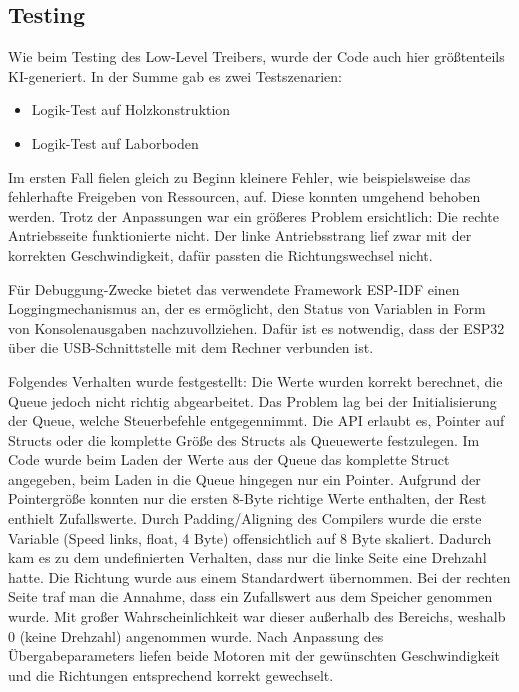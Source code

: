 \subsection{Testing} \label{sec:diff_drive_tests}

Wie beim Testing des Low-Level Treibers, wurde der Code auch hier größtenteils KI-generiert. In der Summe gab es zwei Testszenarien:

\begin{itemize}
    \item Logik-Test auf Holzkonstruktion
    \item Logik-Test auf Laborboden
\end{itemize}

Im ersten Fall fielen gleich zu Beginn kleinere Fehler, wie beispielsweise das fehlerhafte Freigeben von Ressourcen, auf. Diese konnten umgehend behoben werden. Trotz der Anpassungen war ein größeres Problem ersichtlich: Die rechte Antriebsseite funktionierte nicht. Der linke Antriebsstrang lief zwar mit der korrekten Geschwindigkeit, dafür passten die Richtungswechsel nicht. \newline

Für Debuggung-Zwecke bietet das verwendete Framework ESP-IDF einen Loggingmechanismus an, der es ermöglicht, den Status von Variablen in Form von Konsolenausgaben nachzuvollziehen. Dafür ist es notwendig, dass der ESP32 über die USB-Schnittstelle mit dem Rechner verbunden ist. \newline

Folgendes Verhalten wurde festgestellt: Die Werte wurden korrekt berechnet, die Queue jedoch nicht richtig abgearbeitet. Das Problem lag bei der Initialisierung der Queue, welche Steuerbefehle entgegennimmt. Die API erlaubt es, Pointer auf Structs oder die komplette Größe des Structs als Queuewerte festzulegen. Im Code wurde beim Laden der Werte aus der Queue das komplette Struct angegeben, beim Laden in die Queue hingegen nur ein Pointer. Aufgrund der Pointergröße konnten nur die ersten 8-Byte richtige Werte enthalten, der Rest enthielt Zufallswerte. Durch Padding/Aligning des Compilers wurde die erste Variable (Speed links, float, 4 Byte) offensichtlich auf 8 Byte skaliert. Dadurch kam es zu dem undefinierten Verhalten, dass nur die linke Seite eine Drehzahl hatte. Die Richtung wurde aus einem Standardwert übernommen. Bei der rechten Seite traf man die Annahme, dass ein Zufallswert aus dem Speicher genommen wurde. Mit großer Wahrscheinlichkeit war dieser außerhalb des Bereichs, weshalb 0 (keine Drehzahl) angenommen wurde. Nach Anpassung des Übergabeparameters liefen beide Motoren mit der gewünschten Geschwindigkeit und die Richtungen entsprechend korrekt gewechselt. \newline

